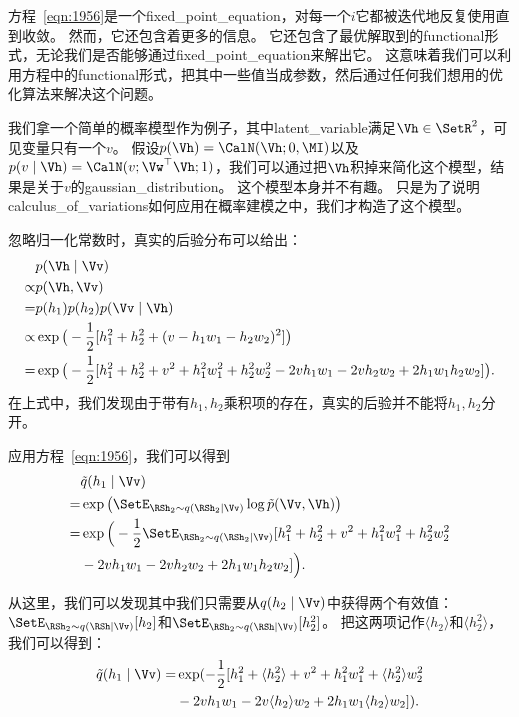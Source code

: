 方程~\eqref{eqn:1956}是一个\gls{fixed_point_equation}，对每一个$i$它都被迭代地反复使用直到收敛。
然而，它还包含着更多的信息。
它还包含了最优解取到的\gls{functional}形式，无论我们是否能够通过\gls{fixed_point_equation}来解出它。
这意味着我们可以利用方程中的\gls{functional}形式，把其中一些值当成参数，然后通过任何我们想用的优化算法来解决这个问题。


我们拿一个简单的概率模型作为例子，其中\gls{latent_variable}满足$\Vh\in\SetR^2$，可见变量只有一个$v$。
假设$p(\Vh) = \CalN(\Vh;0,\MI)$以及$p(v\mid\Vh) = \CalN(v;\Vw^{\top}\Vh;1)$，我们可以通过把$\Vh$积掉来简化这个模型，结果是关于$v$的\gls{gaussian_distribution}。
这个模型本身并不有趣。
只是为了说明\gls{calculus_of_variations}如何应用在概率建模之中，我们才构造了这个模型。



忽略归一化常数时，真实的后验分布可以给出：
\begin{align}
	\label{eqn:1957}
   & p(\Vh\mid\Vv)\\
 \propto & p(\Vh, \Vv)\\
 = & p(h_1) p(h_2) p(\Vv\mid\Vh)\\
 \propto & \exp \big(-\frac{1}{2} [h_1^2 + h_2^2 + (v-h_1w_1 - h_2w_2)^2]\big)\\
 = & \exp \big( - \frac{1}{2} [h_1^2 + h_2^2 + v^2 + h_1^2w_1^2 + h_2^2w_2^2 - 2vh_1w_1 - 2vh_2w_2 + 2h_1w_1h_2w_2] \big).
\end{align}
在上式中，我们发现由于带有$h_1,h_2$乘积项的存在，真实的后验并不能将$h_1,h_2$分开。



应用方程~\eqref{eqn:1956}，我们可以得到
\begin{align}
\label{eqn:1962}
& \tilde{q}(h_1\mid\Vv)\\ 
= & \exp\big(\SetE_{\RSh_2\sim q(\RSh_2\mid\Vv)} \log \tilde{p}(\Vv,\Vh)\big) \\
= & \exp\Big( -\frac{1}{2} \SetE_{\RSh_2\sim q(\RSh_2\mid\Vv)} [h_1^2 + h_2^2 + v^2 + h_1^2w_1^2 + h_2^2w_2^2 \\
& -2vh_1w_1 - 2vh_2w_2 + 2h_1w_1h_2w_2]\Big).
\end{align}


从这里，我们可以发现其中我们只需要从$q(h_2\mid \Vv)$中获得两个有效值：
$\SetE_{\RSh_2\sim q(\RSh\mid\Vv)}[h_2]$和$\SetE_{\RSh_2\sim q(\RSh\mid\Vv)}[h_2^2]$。
把这两项记作$\langle h_2 \rangle$和$\langle h_2^2 \rangle$，我们可以得到：
\begin{align}
\label{eqn:1966}
\tilde{q}(h_1\mid\Vv) = & \exp(-\frac{1}{2} [h_1^2 + \langle h_2^2 \rangle  + v^2 + h_1^2w_1^2 + \langle h_2^2 \rangle w_2^2 
\\ &	-2vh_1w_1 - 2v\langle h_2 \rangle w_2 + 2h_1w_1\langle h_2 \rangle w_2]).	
\end{align}


